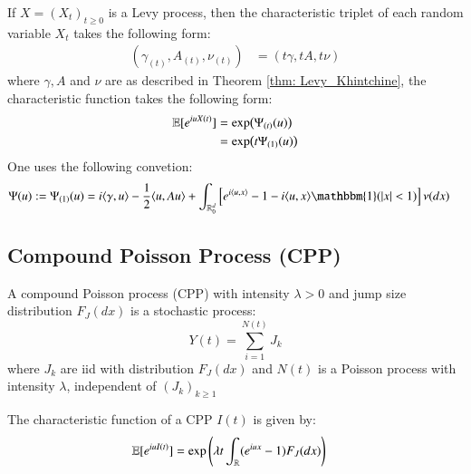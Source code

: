 \begin{theorem}
If $X = (X_{t})_{t\geq 0}$ is a Levy process, then the characteristic triplet of each random variable $X_{t}$ takes the following form: 
\begin{align*}
(\gamma_{(t)}, A_{(t)}, \nu_{(t)})
&= 
(t\gamma, tA, t\nu)
\end{align*}
where $\gamma, A$ and $\nu$ are as described in Theorem \ref{thm: Levy_Khintchine}, the characteristic function takes the following form: 
\begin{align*}
\mathbb{E}[e^{iuX(t)}] &= \exp(\Psi_{(t)}(u)) \\ 
 &= \exp(t\Psi_{(1)}(u))
\end{align*}
One uses the following convetion: 
\begin{align*}
\Psi(u):= \Psi_{(1)}(u) 
&= 
i\langle \gamma, u \rangle - 
\frac{1}{2}\langle u, Au \rangle 
+ \int_{\R_{0}^{d}}\left[
e^{i \langle u, x\rangle} - 1 - i\langle u, x\rangle\mathbbm{1}(|x|<1)
\right]\nu(dx)  
\end{align*}
\end{theorem}


\newpage 

\subsection{Compound Poisson Process (CPP)}

\begin{definition}
\label{def: CPP}
A compound Poisson process (CPP)  with intensity $\lambda > 0$ and jump size distribution $F_{J}(dx)$  is a stochastic process: 
$$
Y(t) = \sum_{i=1}^{N(t)}J_{k}
$$
where $J_{k}$ are iid with distribution $F_{J}(dx)$ and $N(t)$ is a Poisson process with intensity $\lambda$, independent of $(J_{k})_{k\geq 1}$
\end{definition}

\begin{proposition}
\label{prop: characteristic_function_CPP}
The characteristic function of a CPP $I(t)$ is given by: 
\begin{align*}
\mathbb{E}[e^{iuI(t)}] &= \exp\left(
\lambda t \int_{\mathbb{R}}(e^{iux}-1)F_{J}(dx)
\right)    
\end{align*}
\end{proposition} 

